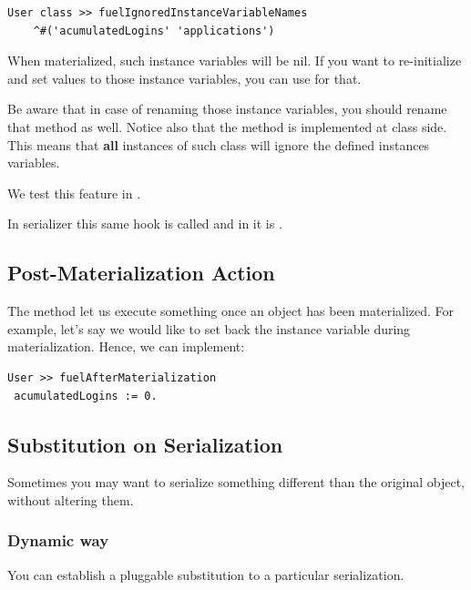 \documentclass[a4paper,10pt,twoside]{book}
\begin{document}
\begin{lstlisting}
User class >> fuelIgnoredInstanceVariableNames
    ^#('acumulatedLogins' 'applications')
\end{lstlisting}

When materialized, such instance variables will be nil. If you want to re-initialize and set values to those instance variables, you can use  for that.

Be aware that in case of renaming those instance variables, you should rename that method as well. Notice also that the method  is implemented at class side. This means that \textbf{all} instances of such class will ignore the defined instances variables. 

We test this feature in .

In  serializer this same hook is called  and in  it is . 

\subsection{Post-Materialization Action}

The method  let us execute something once an object has been materialized. For example, let's say we would like to set back the instance variable  during materialization. Hence, we can implement:

\begin{lstlisting}
User >> fuelAfterMaterialization
 acumulatedLogins := 0. 
\end{lstlisting}

\subsection{Substitution on Serialization}

Sometimes you may want to serialize something different than the original object, without altering them.

\subsubsection{Dynamic way}

You can establish a pluggable substitution to a particular serialization. 
\end{document}
